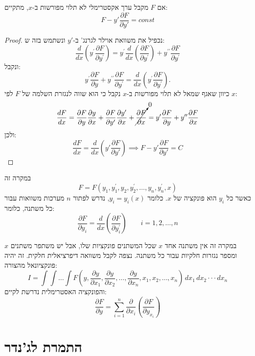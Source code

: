 \documentclass{tstextbook}
\begin{document}
\begin{theorem}
אם \(F\) מקבל ערך אקסטרימלי לא תלוי מפורשות ב-\(x\), מתקיים:
$$F-y'\frac{\partial F}{\partial y'}=const$$

\end{theorem}
\begin{proof}
נכפיל את משוואת אוילר לגרנג' ב-\(y'\) ונשתמש בזה ש:
$${\frac{d}{d x}}\left(y^{\prime}{\frac{\partial F}{\partial y^{\prime}}}\right)=y^{\prime}{\frac{d}{d x}}\left({\frac{\partial F}{\partial y^{\prime}}}\right)+y^{\prime\prime}{\frac{\partial F}{\partial y^{\prime}}}$$
ונקבל:
$$y^{\prime}{\frac{\partial F}{\partial y}}+y^{\prime\prime}{\frac{\partial F}{\partial y^{\prime}}}={\frac{d}{d x}}\left(y^{\prime}{\frac{\partial F}{\partial y^{\prime}}}\right).$$
כיוון שאגף שמאל לא תלוי מפורשות ב-\(x\) נקבל כי הוא שווה לנגזרת השלמה של \(F\) לפי \(x\):
$$\frac{dF}{dx}=\frac{\partial F}{\partial y}\frac{\partial y}{\partial x}+\frac{\partial F}{\partial y'}\frac{\partial y'}{\partial x}+\cancelto{ 0 }{ \frac{\partial F}{\partial x} }=y'\frac{\partial F}{\partial y}+y''\frac{\partial F}{\partial x}$$
ולכן:
$$\frac{dF}{dx}=\frac{d}{dx}\left( y'\frac{\partial F}{\partial y'} \right)\implies F-y'\frac{\partial F}{\partial y'}=C$$

\end{proof}
\begin{definition}
במקרה זה 
$$F=F(y_{1},y_{1}^{\prime},y_{2},y_{2}^{\prime},\ldots,y_{n},y_{n}^{\prime},x)$$
כאשר כל \(y_{i}\) הוא פונקציה של \(x\). כלומר \(y_{i}=y_{i}(x)\), נדרש לפתור \(n\) מערכות משוואות עבור כל משתנה, כלומר:
$$\frac{\partial F}{\partial y_{i}}=\frac{d}{d x}\left(\frac{\partial F}{\partial y_{i}^{\prime}}\right)\qquad i=1,2,\ldots,n$$

\end{definition}
\begin{definition}
במקרה זה אין משתנה אחד \(x\) שכל המשתנים פונקציות שלו, אבל יש משתפר משתנים \(x\) ומספר נגזרות חלקיות עבור כל משתנה. נצפה לקבל משוואה דיפרציאלית חלקית. זה יהיה פונקציונאל מהצורה:
$$I=\int\int\dots\int F\left(y,{\frac{\partial y}{\partial x_{1}}},{\frac{\partial y}{\partial x_{2}}},\ldots,{\frac{\partial y}{\partial x_{n}}},x_{1},x_{2},\ldots,x_{n}\right)\,d x_{1}\,d x_{2}\cdot\cdot\cdot d x_{n}$$
והפונקציה האסטרימלית נדרשת לקיים:
$${\frac{\partial F}{\partial y}}=\sum_{i=1}^{n}{\frac{\partial}{\partial x_{i}}}\left({\frac{\partial F}{\partial y_{x_{i}}}}\right)$$

\end{definition}
\section{התמרת לג'נדר}
\end{document}
